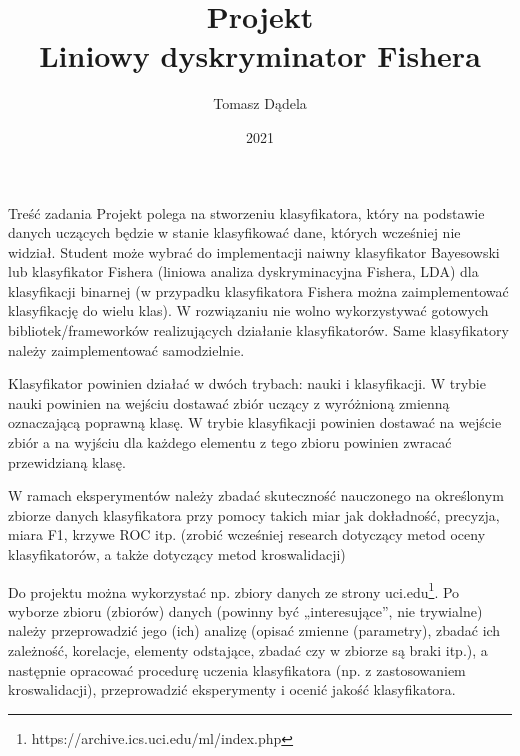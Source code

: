 \documentclass[a4paper]{article}
\title{Projekt\\Liniowy dyskryminator Fishera}
\date{2021}
\author{Tomasz Dądela}
\begin{document}
				\maketitle
\begin{section}{Treść zadania}
				Projekt polega na stworzeniu klasyfikatora, który na podstawie danych uczących będzie w stanie klasyfikować dane, których wcześniej nie widział. Student może wybrać do implementacji naiwny klasyfikator Bayesowski lub klasyfikator Fishera (liniowa analiza dyskryminacyjna Fishera, LDA) dla klasyfikacji binarnej (w przypadku klasyfikatora Fishera można zaimplementować klasyfikację do wielu klas). W rozwiązaniu nie wolno wykorzystywać gotowych bibliotek/frameworków realizujących działanie klasyfikatorów. Same klasyfikatory należy zaimplementować samodzielnie.

				Klasyfikator powinien działać w dwóch trybach: nauki i klasyfikacji. W trybie nauki powinien na wejściu dostawać zbiór uczący z wyróżnioną zmienną oznaczającą poprawną klasę. W trybie klasyfikacji powinien dostawać na wejście zbiór a na wyjściu dla każdego elementu z tego zbioru powinien zwracać przewidzianą klasę.

				W ramach eksperymentów należy zbadać skuteczność nauczonego na określonym zbiorze danych klasyfikatora przy pomocy takich miar jak dokładność, precyzja, miara F1, krzywe ROC itp. (zrobić wcześniej research dotyczący metod oceny klasyfikatorów, a także dotyczący metod kroswalidacji)

				Do projektu można wykorzystać np. zbiory danych ze strony uci.edu\footnote{https://archive.ics.uci.edu/ml/index.php}. Po wyborze zbioru (zbiorów) danych (powinny być „interesujące”, nie trywialne) należy przeprowadzić jego (ich) analizę (opisać zmienne (parametry), zbadać ich zależność, korelacje, elementy odstające, zbadać czy w zbiorze są braki itp.), a następnie opracować procedurę uczenia klasyfikatora (np. z zastosowaniem kroswalidacji), przeprowadzić eksperymenty i ocenić jakość klasyfikatora.
\end{section}
\end{document}
